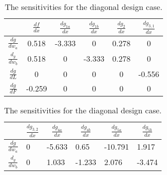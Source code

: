 \begin{table}
	\centering
	\caption{The sensitivities for the diagonal design case.}
	\label{tab:diagsens1}
	\begin{tabular}{c|ccccc}
		\textbf{}                    & \textbf{$\frac{d f }{d  x}$}   & \textbf{$\frac{d g_{1a}}{d  x}$} & \textbf{$\frac{d g_{1b}}{d  x}$} & \textbf{$\frac{d g_{2}}{d  x}$} & \textbf{$\frac{d g_{3,1}}{d  x}$} \\ \hline
		\textbf{$\frac{d g}{dw_a}$}  & \cellcolor[HTML]{9AFF99}0.518  & \cellcolor[HTML]{9AFF99}-3.333   & 0                                & 0.278                           & 0                                 \\ 
		\textbf{$\frac{d_g}{d w_b}$} & \cellcolor[HTML]{9AFF99}0.518  & 0                                & -3.333                           & 0.278                           & 0                                 \\ 
		\textbf{$\frac{d g}{d L}$}   & 0                              & 0                                & 0                                & 0                               & -0.556                            \\ 
		\textbf{$\frac{dg}{d F}$}    & \cellcolor[HTML]{9AFF99}-0.259 & 0                                & 0                                & 0                               & 0                                 \\ 
	\end{tabular}
	\begin{tabular}{c|lllll}
		\textbf{}                    & \multicolumn{1}{c|}{\textbf{$\frac{d g_{3,2} }{d  x}$}} & \multicolumn{1}{c|}{\textbf{$\frac{d g_{4a}}{d  x}$}} & \multicolumn{1}{c|}{\textbf{$\frac{d g_{4b}}{d  x}$}} & \multicolumn{1}{c|}{\textbf{$\frac{d g_{5a}}{d  x}$}} & \multicolumn{1}{c|}{\textbf{$\frac{d g_{5b}}{d  x}$}} \\ \hline
		\textbf{$\frac{d g}{dw_a}$}  & 0                                                       & \cellcolor[HTML]{9AFF99}-5.633                        & 0.65                                                  & \cellcolor[HTML]{9AFF99}-10.791                       & 1.917                                                 \\ 
		\textbf{$\frac{d_g}{d w_b}$} & 0                                                       & 1.033                                                 & -1.233                                                & 2.076                                                 & \cellcolor[HTML]{9AFF99}-3.474                        \\ 

\end{tabular}
\end{table}

